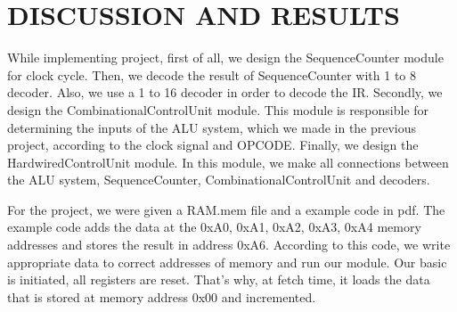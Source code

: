 \documentclass[pdftex,12pt,a4paper]{article}
\begin{document}
\newpage
\section{DISCUSSION AND RESULTS} 
While implementing project, first of all, we design the SequenceCounter module for clock cycle. Then, we decode the result of SequenceCounter with 1 to 8 decoder. Also, we use a 1 to 16 decoder in order to decode the IR.
Secondly, we design the CombinationalControlUnit module. This module is responsible for determining the inputs of the ALU system, which we made in the previous project, according to the clock signal and OPCODE.
Finally, we design the HardwiredControlUnit module. In this module, we make all connections between the ALU system, SequenceCounter, CombinationalControlUnit and decoders.

For the project, we were given a RAM.mem file and a example code in pdf. The example code adds the data at the 0xA0, 0xA1, 0xA2, 0xA3, 0xA4 memory addresses and stores the result in address 0xA6. According to this code, we write appropriate data to correct addresses of memory and run our module. Our basic is initiated, all registers are reset. That's why, at fetch time, it loads the data that is stored at memory address 0x00 and incremented.
\end{document}
